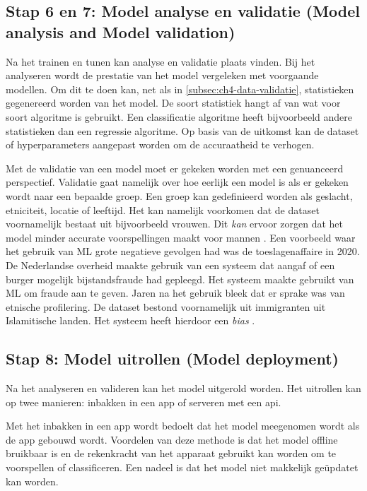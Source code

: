 \subsection{Stap 6 en 7: Model analyse en validatie (Model analysis and Model validation)}\label{subsec:ch4-model-analyse-en-validatie}
Na het trainen en tunen kan analyse en validatie plaats vinden. Bij het analyseren wordt de prestatie van het model vergeleken met voorgaande modellen. Om dit te doen kan, net als in \autoref{subsec:ch4-data-validatie}, statistieken gegenereerd worden van het model. De soort statistiek hangt af van wat voor soort algoritme is gebruikt. Een classificatie algoritme heeft bijvoorbeeld andere statistieken dan een regressie algoritme. Op basis van de uitkomst kan de dataset of hyperparameters aangepast worden om de accuraatheid te verhogen.

Met de validatie van een model moet er gekeken worden met een genuanceerd perspectief. Validatie gaat namelijk over hoe eerlijk een model is als er gekeken wordt naar een bepaalde groep. Een groep kan gedefinieerd worden als geslacht, etniciteit, locatie of leeftijd. Het kan namelijk voorkomen dat de dataset voornamelijk bestaat uit bijvoorbeeld vrouwen. Dit \textit{kan} ervoor zorgen dat het model minder accurate voorspellingen maakt voor mannen \cite[p.~109-110]{introduction-to-machine-learning}. Een voorbeeld waar het gebruik van ML grote negatieve gevolgen had was de toeslagenaffaire in 2020. De Nederlandse overheid maakte gebruik van een systeem dat aangaf of een burger mogelijk bijstandsfraude had gepleegd. Het systeem maakte gebruikt van ML om fraude aan te geven. Jaren na het gebruik bleek dat er sprake was van etnische profilering. De dataset bestond voornamelijk uit immigranten uit Islamitische landen. Het systeem heeft hierdoor een \textit{bias} \cite{ml-fairness-dutch-syri}.

\subsection{Stap 8: Model uitrollen (Model deployment)}\label{subsec:ch4-model-uitrollen}
Na het analyseren en valideren kan het model uitgerold worden. Het uitrollen kan op twee manieren: inbakken in een app of serveren met een \acrfull{api}.

Met het inbakken in een app wordt bedoelt dat het model meegenomen wordt als de app gebouwd wordt. Voordelen van deze methode is dat het model offline bruikbaar is en de rekenkracht van het apparaat gebruikt kan worden om te voorspellen of classificeren. Een nadeel is dat het model niet makkelijk geüpdatet kan worden.

